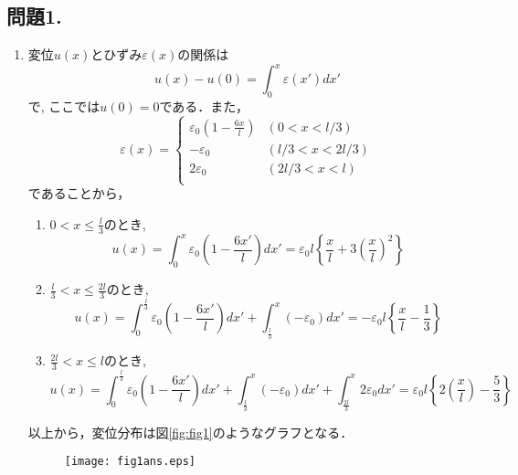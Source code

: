\documentclass[10pt,a4j]{jarticle}
\begin{document}
\subsection*{問題1.}
\begin{enumerate}
\item
変位$u(x)$とひずみ$\varepsilon(x)$の関係は
\begin{equation}
	u(x)-u(0)=\int_0^x \varepsilon(x')dx'
	\label{eqn:eq1}
\end{equation}
で, ここでは$u(0)=0$である．また，
\begin{equation}
	\varepsilon(x) = \left\{
	\begin{array}{cc}
		\varepsilon_0 \left(1-\frac{6x}{l}\right)& (0<x<l/3) \\
		-\varepsilon_0 & (l/3<x<2l/3) \\
		  2\varepsilon_0 & (2l/3<x<l) \\
	\end{array}
	\right.
\end{equation}
であることから，
\begin{enumerate}
\item 
$0<x \leq \frac{l}{3}$のとき, 
\begin{equation}
	u(x) = 
	\int_0^x 
		\varepsilon_0 \left(1-\frac{6x'}{l}\right)
	dx '=
	\varepsilon_0 l
	\left\{
		\frac{x}{l}
		+
		3
		\left(\frac{x}{l}\right)^2
	\right\}
	\label{eqn:u1}
\end{equation}
\item
$\frac{l}{3}<x\leq \frac{2l}{3}$のとき, 
\begin{equation}
	u(x) =
		\int_0^{\frac{l}{3}} 
		\varepsilon_0 \left(1-\frac{6x'}{l}\right)
		dx '
		+
		\int_{\frac{l}{3}}^x (-\varepsilon_0 )dx '
		=
		-\varepsilon_0 l
		\left\{ \frac{x}{l}-\frac{1}{3}\right\}
	\label{eqn:u2}
\end{equation}
\item
$\frac{2l}{3}<x\leq l$のとき, 
\begin{equation}
	u(x) =
		\int_0^{\frac{l}{3}} 
		\varepsilon_0 \left(1-\frac{6x'}{l}\right)
		dx '
		+
		\int_{\frac{l}{3}}^x (-\varepsilon_0 )dx '
		+
		\int_{\frac{2l}{3}}^x 2\varepsilon_0 dx '
		=
		\varepsilon_0 l
		\left\{ 2\left(\frac{x}{l}\right)-\frac{5}{3}\right\}
	\label{eqn:u3}
\end{equation}
\end{enumerate}
以上から，変位分布は図\ref{fig:fig1}のようなグラフとなる．
%
\begin{figure}[h]
	\begin{center}
	\texttt{[image: fig1ans.eps]} 

\end{center}
\end{figure}
\end{enumerate}
\end{document}
